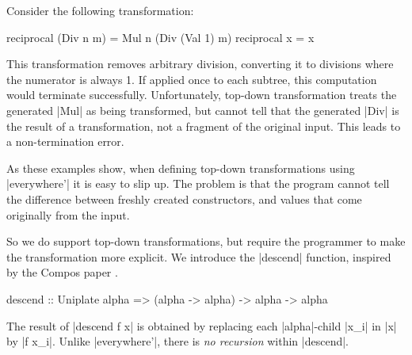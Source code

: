 \begin{example}
Consider the following transformation:

\begin{code}
reciprocal (Div n m)  = Mul n (Div (Val 1) m)
reciprocal x          = x
\end{code}

This transformation removes arbitrary division, converting it to divisions where the numerator is always 1. If applied once to each subtree, this computation would terminate successfully. Unfortunately, top-down transformation treats the generated |Mul| as  being transformed, but cannot tell that the generated |Div| is the result of a transformation, not a fragment of the original input. This leads to a non-termination error.
\end{example}

As these examples show, when defining top-down transformations using |everywhere'| it is easy to slip up. The problem is that the program cannot tell the difference between freshly created constructors, and values that come originally from the input.

So we do support top-down transformations, but require the programmer to make the transformation more explicit. We introduce the |descend| function, inspired by the Compos paper \cite{bringert:compos}.

\begin{code}
descend :: Uniplate alpha => (alpha -> alpha) -> alpha -> alpha
\end{code}

The result of |descend f x| is obtained by replacing each |alpha|-child |x_i| in |x| by |f x_i|. Unlike |everywhere'|, there is \textit{no recursion} within |descend|.

\begin{comment}
\h{.expr2}\begin{code}
data Expr =  Let String Expr Expr
          |  Add  Expr  Expr  |  Val  Int
          |  Sub  Expr  Expr  |  Var  String
          |  Mul  Expr  Expr  |  Neg  Expr
          |  Div  Expr  Expr
\end{code}
\end{comment}

